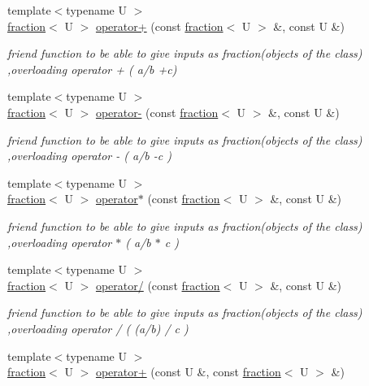 \begin{DoxyCompactItemize}
{\footnotesize template$<$typename U $>$ }\\\hyperlink{classfraction}{fraction}$<$ U $>$ \hyperlink{classfraction_ae89823424fb724266af61bfa09797009}{operator+} (const \hyperlink{classfraction}{fraction}$<$ U $>$ \&, const U \&)
\begin{DoxyCompactList}\small\item\em friend function to be able to give inputs as fraction(objects of the class) ,overloading operator + ( a/b +c) \end{DoxyCompactList}\item 
{\footnotesize template$<$typename U $>$ }\\\hyperlink{classfraction}{fraction}$<$ U $>$ \hyperlink{classfraction_a84647c023668f65f5013eb3034e5f636}{operator-\/} (const \hyperlink{classfraction}{fraction}$<$ U $>$ \&, const U \&)
\begin{DoxyCompactList}\small\item\em friend function to be able to give inputs as fraction(objects of the class) ,overloading operator -\/ ( a/b -\/c ) \end{DoxyCompactList}\item 
{\footnotesize template$<$typename U $>$ }\\\hyperlink{classfraction}{fraction}$<$ U $>$ \hyperlink{classfraction_a7a77480266369ecda91dc06b2244c935}{operator$\ast$} (const \hyperlink{classfraction}{fraction}$<$ U $>$ \&, const U \&)
\begin{DoxyCompactList}\small\item\em friend function to be able to give inputs as fraction(objects of the class) ,overloading operator $\ast$ ( a/b $\ast$ c ) \end{DoxyCompactList}\item 
{\footnotesize template$<$typename U $>$ }\\\hyperlink{classfraction}{fraction}$<$ U $>$ \hyperlink{classfraction_a8cae4fd1fa69a30be8d60196c09dce25}{operator/} (const \hyperlink{classfraction}{fraction}$<$ U $>$ \&, const U \&)
\begin{DoxyCompactList}\small\item\em friend function to be able to give inputs as fraction(objects of the class) ,overloading operator / ( (a/b) / c ) \end{DoxyCompactList}\item 
{\footnotesize template$<$typename U $>$ }\\\hyperlink{classfraction}{fraction}$<$ U $>$ \hyperlink{classfraction_ae0cc6286fb1c4dbe124b2e5e23a70e3a}{operator+} (const U \&, const \hyperlink{classfraction}{fraction}$<$ U $>$ \&)

\end{DoxyCompactItemize}
